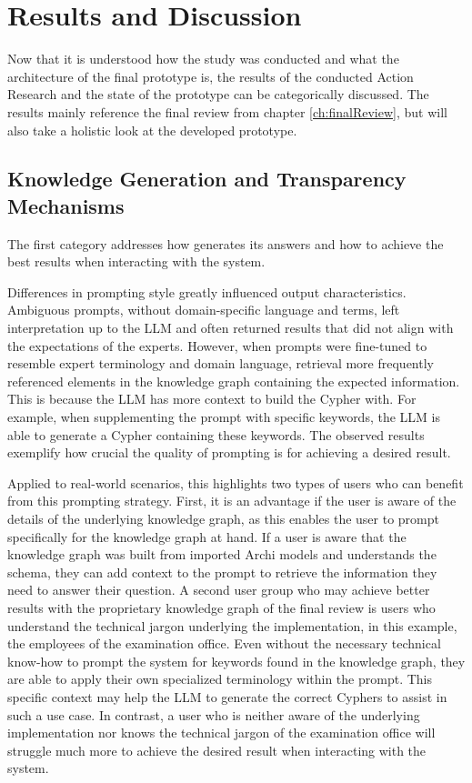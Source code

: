 \chapter{Results and Discussion}
\label{ch:Discussion}
Now that it is understood how the study was conducted and what the architecture of the final prototype is, the results of the conducted Action Research and the state of the prototype can be categorically discussed. The results mainly reference the final review from chapter \ref{ch:finalReview}, but will also take a holistic look at the developed prototype.

\section{Knowledge Generation and Transparency Mechanisms}
\label{sub:knowledgeGenerationMechanism}
The first category addresses how \prototype{} generates its answers and how to achieve the best results when interacting with the system.

Differences in prompting style greatly influenced output characteristics. Ambiguous prompts, without domain-specific language and terms, left interpretation up to the LLM and often returned results that did not align with the expectations of the experts. However, when prompts were fine-tuned to resemble expert terminology and domain language, retrieval more frequently referenced elements in the knowledge graph containing the expected information. This is because the LLM has more context to build the Cypher with. For example, when supplementing the prompt with specific keywords, the LLM is able to generate a Cypher containing these keywords. The observed results exemplify how crucial the quality of prompting is for achieving a desired result.

Applied to real-world scenarios, this highlights two types of users who can benefit from this prompting strategy. First, it is an advantage if the user is aware of the details of the underlying knowledge graph, as this enables the user to prompt specifically for the knowledge graph at hand. If a user is aware that the knowledge graph was built from imported Archi models and understands the schema, they can add context to the prompt to retrieve the information they need to answer their question. A second user group  who may achieve better results with the proprietary knowledge graph of the final review is users who understand the technical jargon underlying the implementation, in this example, the employees of the examination office. Even without the necessary technical know-how to prompt the system for keywords found in the knowledge graph, they are able to apply their own specialized terminology within the prompt. This specific context may help the LLM to generate the correct Cyphers to assist in such a use case. In contrast, a user who is neither aware of the underlying implementation nor knows the technical jargon of the examination office will struggle much more to achieve the desired result when interacting with the system.

